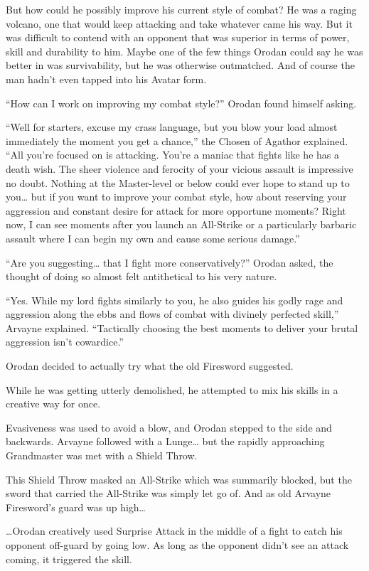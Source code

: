 \documentclass[a4paper,10pt]{book}
\begin{document}
But how could he possibly improve his current style of combat? He was a raging volcano, one that would keep attacking and take whatever came his way. But it was difficult to contend with an opponent that was superior in terms of power, skill and durability to him. Maybe one of the few things Orodan could say he was better in was survivability, but he was otherwise outmatched. And of course the man hadn’t even tapped into his Avatar form.\par
“How can I work on improving my combat style?” Orodan found himself asking.\par
“Well for starters, excuse my crass language, but you blow your load almost immediately the moment you get a chance,” the Chosen of Agathor explained. “All you’re focused on is attacking. You’re a maniac that fights like he has a death wish. The sheer violence and ferocity of your vicious assault is impressive no doubt. Nothing at the Master-level or below could ever hope to stand up to you… but if you want to improve your combat style, how about reserving your aggression and constant desire for attack for more opportune moments? Right now, I can see moments after you launch an All-Strike or a particularly barbaric assault where I can begin my own and cause some serious damage.”\par
“Are you suggesting… that I fight more conservatively?” Orodan asked, the thought of doing so almost felt antithetical to his very nature.\par
“Yes. While my lord fights similarly to you, he also guides his godly rage and aggression along the ebbs and flows of combat with divinely perfected skill,” Arvayne explained. “Tactically choosing the best moments to deliver your brutal aggression isn’t cowardice.”\par
Orodan decided to actually try what the old Firesword suggested.\par
While he was getting utterly demolished, he attempted to mix his skills in a creative way for once.\par
Evasiveness was used to avoid a blow, and Orodan stepped to the side and backwards. Arvayne followed with a Lunge… but the rapidly approaching Grandmaster was met with a Shield Throw.\par
This Shield Throw masked an All-Strike which was summarily blocked, but the sword that carried the All-Strike was simply let go of. And as old Arvayne Firesword’s guard was up high…\par
…Orodan creatively used Surprise Attack in the middle of a fight to catch his opponent off-guard by going low. As long as the opponent didn’t see an attack coming, it triggered the skill.\par
\end{document}
